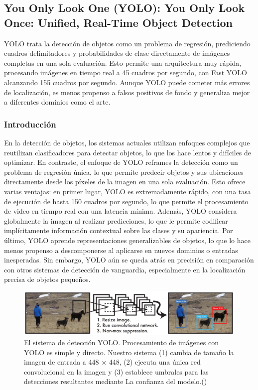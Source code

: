  
 \subsection{You Only Look One (YOLO): You Only Look Once: Unified, Real-Time Object Detection \citep*{tecnica4}}
YOLO trata la detección de objetos como un problema de regresión, prediciendo cuadros delimitadores y probabilidades de clase directamente de imágenes completas en una sola evaluación. Esto permite una arquitectura muy rápida, procesando imágenes en tiempo real a 45 cuadros por segundo, con Fast YOLO alcanzando 155 cuadros por segundo. Aunque YOLO puede cometer más errores de localización, es menos propenso a falsos positivos de fondo y generaliza mejor a diferentes dominios como el arte.
 \subsubsection{Introducción}
En la detección de objetos, los sistemas actuales utilizan enfoques complejos que reutilizan clasificadores para detectar objetos, lo que los hace lentos y difíciles de optimizar. En contraste, el enfoque de YOLO reframes la detección como un problema de regresión única, lo que permite predecir objetos y sus ubicaciones directamente desde los píxeles de la imagen en una sola evaluación. Esto ofrece varias ventajas: en primer lugar, YOLO es extremadamente rápido, con una tasa de ejecución de hasta 150 cuadros por segundo, lo que permite el procesamiento de video en tiempo real con una latencia mínima. Además, YOLO considera globalmente la imagen al realizar predicciones, lo que le permite codificar implícitamente información contextual sobre las clases y su apariencia. Por último, YOLO aprende representaciones generalizables de objetos, lo que lo hace menos propenso a descomponerse al aplicarse en nuevos dominios o entradas inesperadas. Sin embargo, YOLO aún se queda atrás en precisión en comparación con otros sistemas de detección de vanguardia, especialmente en la localización precisa de objetos pequeños.

  \begin{figure}[H]
	\begin{center}
		\includegraphics[width=1\textwidth]{2/figures/yolo1.jpeg}
		\caption{El sistema de detección YOLO. Procesamiento de imágenes
			con YOLO es simple y directo. Nuestro sistema (1) cambia de tamaño
			la imagen de entrada a 448 × 448, (2) ejecuta una única red convolucional en la imagen y (3) establece umbrales para las detecciones resultantes mediante
			La confianza del modelo.(\cite{tecnica4})}
	\end{center}
\end{figure}

